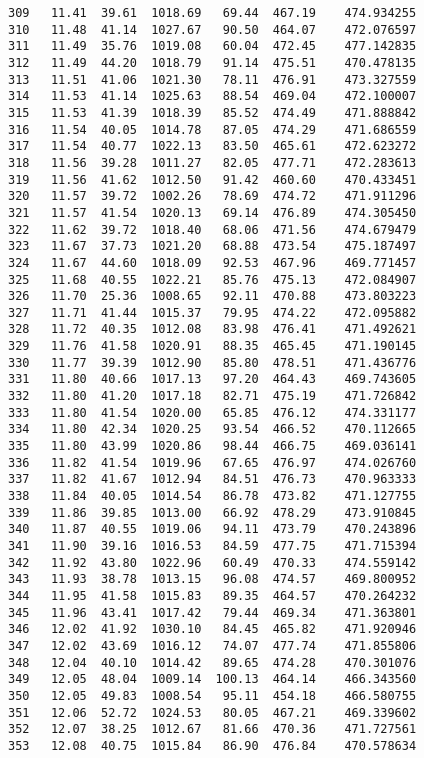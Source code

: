 \documentclass[11pt]{article}
\begin{document}
\begin{tcolorbox}[breakable, size=fbox, boxrule=.5pt, pad at break*=1mm, opacityfill=0]
\begin{Verbatim}[commandchars=\\\{\}]
309   11.41  39.61  1018.69   69.44  467.19    474.934255
310   11.48  41.14  1027.67   90.50  464.07    472.076597
311   11.49  35.76  1019.08   60.04  472.45    477.142835
312   11.49  44.20  1018.79   91.14  475.51    470.478135
313   11.51  41.06  1021.30   78.11  476.91    473.327559
314   11.53  41.14  1025.63   88.54  469.04    472.100007
315   11.53  41.39  1018.39   85.52  474.49    471.888842
316   11.54  40.05  1014.78   87.05  474.29    471.686559
317   11.54  40.77  1022.13   83.50  465.61    472.623272
318   11.56  39.28  1011.27   82.05  477.71    472.283613
319   11.56  41.62  1012.50   91.42  460.60    470.433451
320   11.57  39.72  1002.26   78.69  474.72    471.911296
321   11.57  41.54  1020.13   69.14  476.89    474.305450
322   11.62  39.72  1018.40   68.06  471.56    474.679479
323   11.67  37.73  1021.20   68.88  473.54    475.187497
324   11.67  44.60  1018.09   92.53  467.96    469.771457
325   11.68  40.55  1022.21   85.76  475.13    472.084907
326   11.70  25.36  1008.65   92.11  470.88    473.803223
327   11.71  41.44  1015.37   79.95  474.22    472.095882
328   11.72  40.35  1012.08   83.98  476.41    471.492621
329   11.76  41.58  1020.91   88.35  465.45    471.190145
330   11.77  39.39  1012.90   85.80  478.51    471.436776
331   11.80  40.66  1017.13   97.20  464.43    469.743605
332   11.80  41.20  1017.18   82.71  475.19    471.726842
333   11.80  41.54  1020.00   65.85  476.12    474.331177
334   11.80  42.34  1020.25   93.54  466.52    470.112665
335   11.80  43.99  1020.86   98.44  466.75    469.036141
336   11.82  41.54  1019.96   67.65  476.97    474.026760
337   11.82  41.67  1012.94   84.51  476.73    470.963333
338   11.84  40.05  1014.54   86.78  473.82    471.127755
339   11.86  39.85  1013.00   66.92  478.29    473.910845
340   11.87  40.55  1019.06   94.11  473.79    470.243896
341   11.90  39.16  1016.53   84.59  477.75    471.715394
342   11.92  43.80  1022.96   60.49  470.33    474.559142
343   11.93  38.78  1013.15   96.08  474.57    469.800952
344   11.95  41.58  1015.83   89.35  464.57    470.264232
345   11.96  43.41  1017.42   79.44  469.34    471.363801
346   12.02  41.92  1030.10   84.45  465.82    471.920946
347   12.02  43.69  1016.12   74.07  477.74    471.855806
348   12.04  40.10  1014.42   89.65  474.28    470.301076
349   12.05  48.04  1009.14  100.13  464.14    466.343560
350   12.05  49.83  1008.54   95.11  454.18    466.580755
351   12.06  52.72  1024.53   80.05  467.21    469.339602
352   12.07  38.25  1012.67   81.66  470.36    471.727561
353   12.08  40.75  1015.84   86.90  476.84    470.578634

\end{Verbatim}
\end{tcolorbox}
\end{document}
